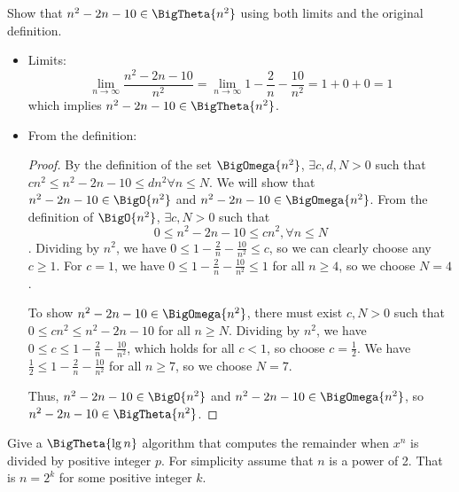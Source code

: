 \documentclass[12pt,letterpaper]{hmcpset}
\begin{document}
\begin{problem}[8]
Show that $n^2 - 2n - 10 \in \BigTheta{n^2}$ using both limits and the original definition.
\end{problem}

\begin{solution}
\begin{itemize}
\item Limits:
\[\lim\limits_{n \to \infty} \frac{n^2 - 2n - 10}{n^2} = \lim\limits_{n \to \infty} 1 - \frac{2}{n} - \frac{10}{n^2} = 1 + 0 + 0 = 1\]
which implies  $n^2 - 2n - 10 \in \BigTheta{n^2}$.

\item From the definition:

\begin{proof}
By the definition of the set $\BigOmega{n^2}$, $\exists c,d,N > 0$ such that $cn^2 \leq n^2 - 2n - 10 \leq dn^2 \forall n \leq N$.  We will show that $n^2 - 2n - 10 \in \BigO{n^2}$ and $n^2 - 2n - 10 \in \BigOmega{n^2}$. From the definition of $\BigO{n^2}$, $\exists c,N > 0$ such that \[0 \leq n^2 - 2n - 10 \leq cn^2,  \forall n \leq N\].
Dividing by $n^2$, we have $0 \leq 1 - \frac{2}{n} - \frac{10}{n^2} \leq c$, so we can clearly choose any $c \geq 1$.  For $c = 1$, we have $0 \leq 1 - \frac{2}{n} - \frac{10}{n^2} \leq 1$ for all $n \geq 4$, so we choose $N = 4$.

To show $n^2 - 2n - 10 \in \BigOmega{n^2}$, there must exist $c,N > 0$ such that $0 \leq cn^2 \leq n^2 - 2n - 10$ for all $n \geq N$.
Dividing by $n^2$, we have $0 \leq c \leq 1 - \frac{2}{n} - \frac{10}{n^2}$, which holds for all $c < 1$, so choose $c = \frac{1}{2}$.  We have $\frac{1}{2} \leq 1 - \frac{2}{n} - \frac{10}{n^2}$ for all $n \geq 7$, so we choose $N=7$.

Thus, $n^2 - 2n - 10 \in \BigO{n^2}$ and $n^2 - 2n - 10 \in \BigOmega{n^2}$, so $n^2 - 2n - 10 \in \BigTheta{n^2}$.
\end{proof}
\end{itemize}
\end{solution}

\begin{problem}
Give a $\BigTheta{\lg n}$ algorithm that computes the remainder when $x^n$ is divided by positive integer $p$.  For simplicity assume that $n$ is a power of 2.  That is $n = 2^k$ for some positive integer $k$. 
\end{problem}
\end{document}
